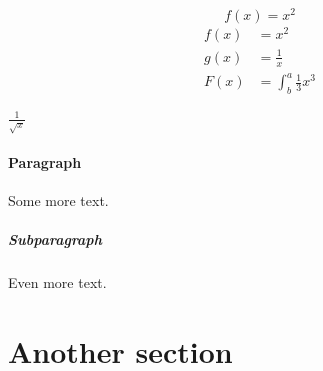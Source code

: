 \documentclass{article}
\begin{document}
\begin{equation*}
  f(x) = x^2
\end{equation*}
\begin{align*}
  f(x) &= x^2\\
  g(x) &= \frac{1}{x}\\
  F(x) &= \int^a_b \frac{1}{3}x^3
\end{align*}

\(\frac{1}{\sqrt{x}}\)

\paragraph{Paragraph}

Some more text.

\subparagraph{Subparagraph}

Even more text.

\section{Another section}
\end{document}
